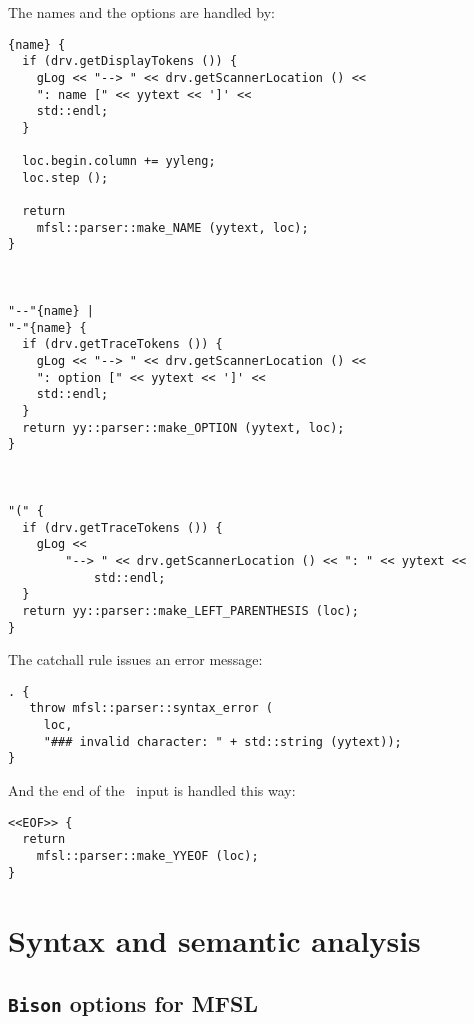 The names and the options are handled by:
\begin{lstlisting}[language=Flex]
{name} {
  if (drv.getDisplayTokens ()) {
    gLog << "--> " << drv.getScannerLocation () <<
    ": name [" << yytext << ']' <<
    std::endl;
  }

  loc.begin.column += yyleng;
  loc.step ();

  return
    mfsl::parser::make_NAME (yytext, loc);
}



"--"{name} |
"-"{name} {
  if (drv.getTraceTokens ()) {
    gLog << "--> " << drv.getScannerLocation () <<
    ": option [" << yytext << ']' <<
    std::endl;
  }
  return yy::parser::make_OPTION (yytext, loc);
}



"(" {
  if (drv.getTraceTokens ()) {
    gLog <<
    	"--> " << drv.getScannerLocation () << ": " << yytext <<
			std::endl;
  }
  return yy::parser::make_LEFT_PARENTHESIS (loc);
}
\end{lstlisting}

The catchall rule issues an error message:
\begin{lstlisting}[language=Flex]
. {
   throw mfsl::parser::syntax_error (
     loc,
     "### invalid character: " + std::string (yytext));
}
\end{lstlisting}

And the end of the \mfslLang\ input is handled this way:
\begin{lstlisting}[language=Flex]
<<EOF>> {
  return
    mfsl::parser::make_YYEOF (loc);
}
\end{lstlisting}


\section{Syntax and semantic analysis}


\subsection{{\tt Bison} options for MFSL}

